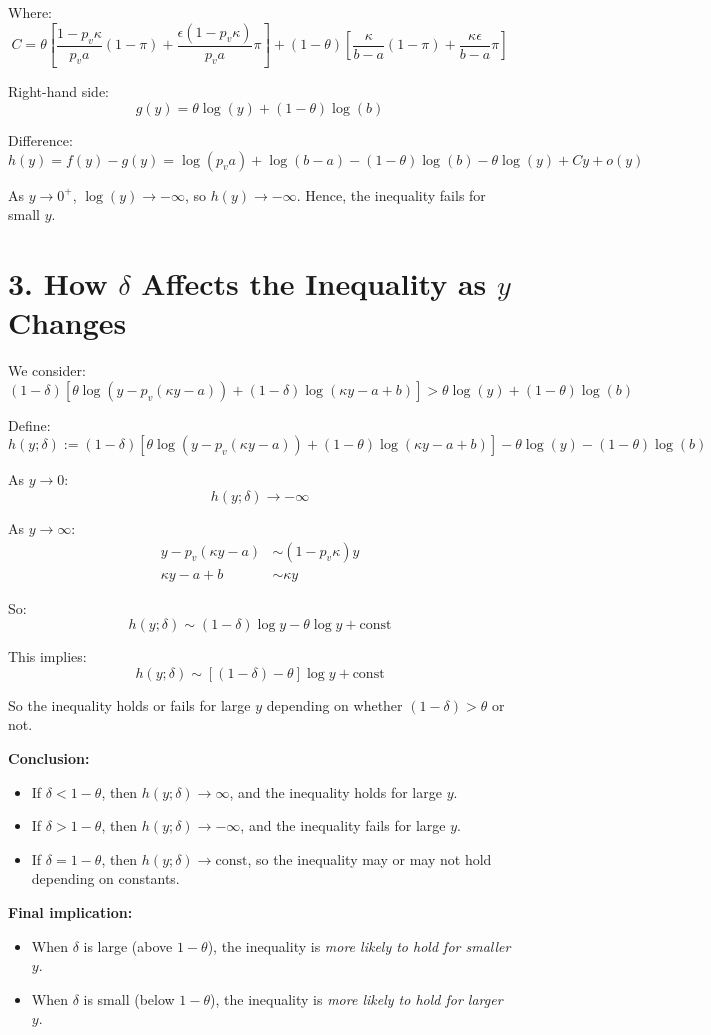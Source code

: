 \documentclass[11pt]{article}
\begin{document}
Where:
\[
C = \theta\left[\frac{1 - p_v \kappa}{p_v a}(1 - \pi) + \frac{\epsilon(1 - p_v \kappa)}{p_v a} \pi\right] + (1 - \theta)\left[\frac{\kappa}{b - a}(1 - \pi) + \frac{\kappa \epsilon}{b - a} \pi\right]
\]

Right-hand side:
\[
g(y) = \theta \log(y) + (1 - \theta)\log(b)
\]

Difference:
\[
h(y) = f(y) - g(y) = \log(p_v a) + \log(b - a) - (1 - \theta)\log(b) - \theta \log(y) + C y + o(y)
\]

As $y \to 0^+$, $\log(y) \to -\infty$, so $h(y) \to -\infty$. Hence, the inequality fails for small $y$.

\section*{3. How $\delta$ Affects the Inequality as $y$ Changes}

We consider:
\[
(1 - \delta)\left[\theta \log(y - p_v(\kappa y - a)) + (1 - \delta)\log(\kappa y - a + b)\right] > \theta \log(y) + (1 - \theta)\log(b)
\]

Define:
\[
h(y; \delta) := (1 - \delta)[\theta \log(y - p_v(\kappa y - a)) + (1 - \theta)\log(\kappa y - a + b)] - \theta \log(y) - (1 - \theta)\log(b)
\]

As $y \to 0$:
\[
h(y; \delta) \to -\infty
\]

As $y \to \infty$:
\begin{align*}
y - p_v(\kappa y - a) &\sim (1 - p_v \kappa)y \\
\kappa y - a + b &\sim \kappa y
\end{align*}

So:
\[
h(y; \delta) \sim (1 - \delta)\log y - \theta \log y + \text{const}
\]

This implies:
\[
h(y; \delta) \sim [(1 - \delta) - \theta] \log y + \text{const}
\]

So the inequality holds or fails for large $y$ depending on whether $(1 - \delta) > \theta$ or not.

\textbf{Conclusion:}
\begin{itemize}
  \item If \( \delta < 1 - \theta \), then \( h(y; \delta) \to \infty \), and the inequality holds for large \( y \).
  \item If \( \delta > 1 - \theta \), then \( h(y; \delta) \to -\infty \), and the inequality fails for large \( y \).
  \item If \( \delta = 1 - \theta \), then \( h(y; \delta) \to \text{const} \), so the inequality may or may not hold depending on constants.
\end{itemize}

\textbf{Final implication:}
\begin{itemize}
  \item When \( \delta \) is large (above $1-\theta$), the inequality is \emph{more likely to hold for smaller \( y \)}.
  \item When \( \delta \) is small (below $1-\theta$), the inequality is \emph{more likely to hold for larger \( y \)}.
\end{itemize}
\end{document}
